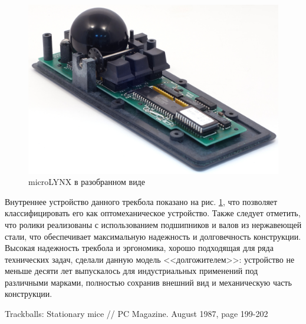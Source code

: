 \documentclass[11pt, a4paper]{article}
\begin{document}
\begin{figure}[h]
    \centering
    \includegraphics[scale=0.5]{1986_honeywell_microlynx_trackball/inside_60.jpg}
    \caption{microLYNX в разобранном виде}
    \label{fig:microLYNXInside}
\end{figure}

Внутреннее устройство данного трекбола показано на рис. \ref{fig:microLYNXInside}, что позволяет классифицировать его как оптомеханическое устройство. Также следует отметить, что ролики реализованы с использованием подшипников и валов из нержавеющей стали, что обеспечивает максимальную надежность и долговечность конструкции. Высокая надежность трекбола и эргономика, хорошо подходящая для ряда технических задач, сделали данную модель <<долгожителем>>: устройство не меньше десяти лет выпускалось для индустриальных применений под различными марками, полностью сохранив внешний вид и механическую часть конструкции.
 
\begin{thebibliography}{9}
 Trackballs: Stationary mice // PC Magazine. August 1987, page 199-202
\end{thebibliography}
\end{document}
